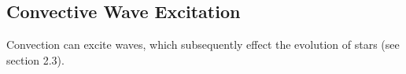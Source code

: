 {\color{purple}
\subsection{Convective Wave Excitation}
}

Convection can excite waves, which subsequently effect the evolution of stars (see section 2.3).
